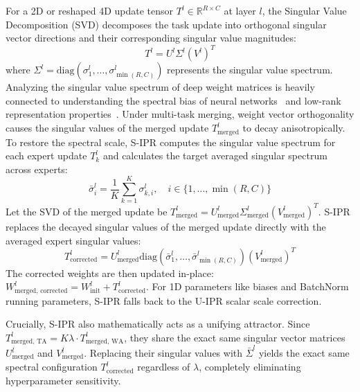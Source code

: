 \documentclass{article}
\begin{document}
For a 2D or reshaped 4D update tensor $T^l \in \mathbb{R}^{R \times C}$ at layer $l$, the Singular Value Decomposition (SVD) decomposes the task update into orthogonal singular vector directions and their corresponding singular value magnitudes:
\begin{equation}
    T^l = U^l \Sigma^l (V^l)^T
\end{equation}
where $\Sigma^l = \text{diag}(\sigma_1^l, \dots, \sigma_{\min(R, C)}^l)$ represents the singular value spectrum. Analyzing the singular value spectrum of deep weight matrices is heavily connected to understanding the spectral bias of neural networks~\cite{rahaman2019spectral} and low-rank representation properties~\cite{leclaire2024singular}. Under multi-task merging, weight vector orthogonality causes the singular values of the merged update $T_{\text{merged}}^l$ to decay anisotropically. To restore the spectral scale, S-IPR computes the singular value spectrum for each expert update $T_k^l$ and calculates the target averaged singular spectrum across experts:
\begin{equation}
    \bar{\sigma}_i^l = \frac{1}{K} \sum_{k=1}^K \sigma_{k, i}^l, \quad i \in \{1, \dots, \min(R, C)\}
\end{equation}
Let the SVD of the merged update be $T_{\text{merged}}^l = U_{\text{merged}}^l \Sigma_{\text{merged}}^l (V_{\text{merged}}^l)^T$. S-IPR replaces the decayed singular values of the merged update directly with the averaged expert singular values:
\begin{equation}
    T_{\text{corrected}}^l = U_{\text{merged}}^l \text{diag}(\bar{\sigma}_1^l, \dots, \bar{\sigma}_{\min(R, C)}^l) (V_{\text{merged}}^l)^T
\end{equation}
The corrected weights are then updated in-place: $W_{\text{merged, corrected}}^l = W_{\text{init}}^l + T_{\text{corrected}}^l$. For 1D parameters like biases and BatchNorm running parameters, S-IPR falls back to the U-IPR scalar scale correction.

Crucially, S-IPR also mathematically acts as a unifying attractor. Since $T_{\text{merged, TA}}^l = K \lambda \cdot T_{\text{merged, WA}}^l$, they share the exact same singular vector matrices $U_{\text{merged}}^l$ and $V_{\text{merged}}^l$. Replacing their singular values with $\bar{\Sigma}^l$ yields the exact same spectral configuration $T_{\text{corrected}}^l$ regardless of $\lambda$, completely eliminating hyperparameter sensitivity.
\end{document}
